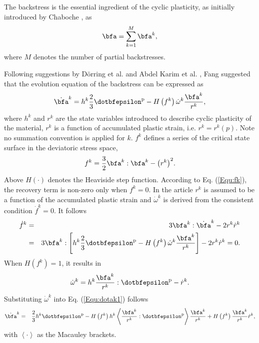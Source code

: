 The backstress is the essential ingredient of the cyclic plasticity, as initially introduced by Chaboche \cite{Chaboche1986149}, as
\begin{equation}
\bfa = \sum\limits_{k = 1}^M {{\bfa^k}},
\end{equation}
where $M$ denotes the number of partial backstresses.

Following suggestions by D\"orring et al. \cite{Doerring2003} and Abdel Karim et al. \cite{AbdelKarim20051303}, Fang \cite{fang2015cyclic} suggested that the evolution equation of the backstress can be expressed as
\begin{equation}
\label{Equ:dotak1}
{\dot\bfa^k} = {h^k}\frac{2}{3}{\dotbfepsilon^{\rm{p}}} - H\left( {{f^k}} \right){\dot \omega ^k}\frac{{{\bfa^k}}}{{{r^k}}},
\end{equation}
where ${{{h}}^k} $ and ${{{r}}^k} $ are the state variables introduced to describe cyclic plasticity of the material, $r^k$ is a function of accumulated plastic strain, i.e. ${r^k} = {r^k}\left( p \right)$.  Note no summation convention is applied for $k$. ${{{f}}^k} $ defines a series of the critical state surface in the deviatoric stress space,
\begin{equation}
\label{Equ:fk}
{f^k} = \frac{3}{2}{\bfa^k}:{\bfa^k} - {\left( {{r^k}} \right)^2}.
\end{equation}
Above  $H(\cdot)$ denotes the Heaviside step function. According to Eq. (\ref{Equ:fk}), the recovery term is non-zero only when ${f^k} = 0$. In the article $r^k$ is assumed to be a function of the accumulated plastic strain and ${\dot \omega ^k}$ is derived from the consistent condition ${\dot f^k} = 0$. It follows
\begin{eqnarray}
\label{Equ:dotfk}
{\dot f^k} &=& 3{\bfa^k}:{\dot\bfa^k} - 2{r^k}{\dot r^k} \\ \nonumber
&=& 3{\bfa^k}:\left[ {{h^k}\frac{2}{3}{{\dotbfepsilon}^{\rm{p}}} - H\left( {{f^k}} \right){{\dot \omega }^k}\frac{{{\bfa^k}}}{{{r^k}}}} \right] - 2{r^k}{\dot r^k} = 0.
\end{eqnarray}
When $H\left( {{f^k}} \right) = 1$, it results in
\begin{equation}
\label{Equ:dotomegak}
{\dot \omega ^k} = {h^k}\frac{{{\bfa^k}}}{{{r^k}}}:{\dotbfepsilon^{\rm{p}}} - {\dot r^k}.
\end{equation}
Substituting ${\dot \omega ^k}$ into Eq. (\ref{Equ:dotak1}) follows
\begin{eqnarray}
\label{Equ:dotak2}
{\dot\bfa^k} &=& \frac{2}{3}{h^k}{\dotbfepsilon^{\rm{p}}} - H\left( {{f^k}} \right){h^k}\left\langle {\frac{{{\bfa^k}}}{{{r^k}}}:{{\dotbfepsilon}^{\rm{p}}}} \right\rangle \frac{{{\bfa^k}}}{{{r^k}}} + H\left( {{f^k}} \right)\frac{{{\bfa^k}}}{{{r^k}}}{\dot r^k},
\end{eqnarray}
with $\left<\cdot\right>$ as the Macauley brackets.

